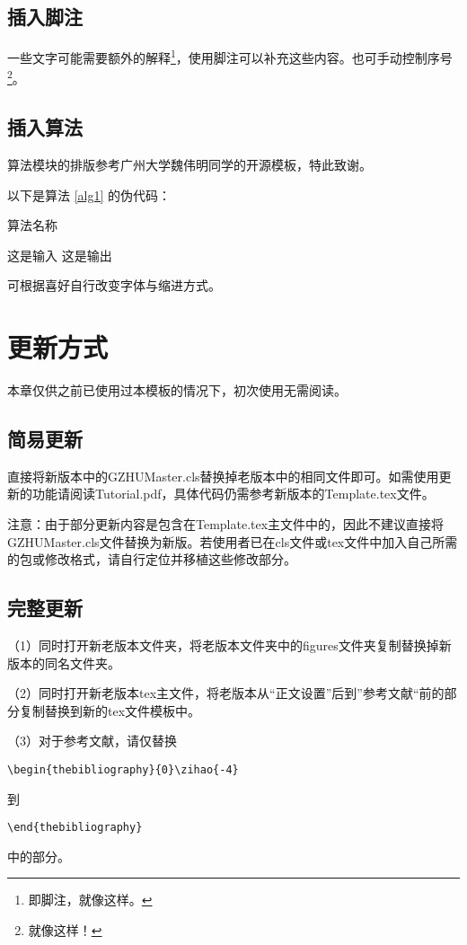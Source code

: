 \documentclass{GZHUMaster}
\begin{document}
\section{插入脚注}
一些文字可能需要额外的解释\footnote{即脚注，就像这样。}，使用脚注可以补充这些内容。也可手动控制序号\footnote[16]{就像这样！}。
\section{插入算法}
算法模块的排版参考广州大学魏伟明同学的开源模板，特此致谢。\par
以下是算法 \ref{alg1} 的伪代码：\par
\begin{algorithm}[h]
  \caption{算法名称}
  \begin{algorithmic}[1] %
      \Require 这是输入
      \Ensure 这是输出
           
      \EndFor
      \EndIf
      \EndWhile
  \end{algorithmic}
  \label{alg1}
\end{algorithm}
可根据喜好自行改变字体与缩进方式。

\chapter{更新方式}
本章仅供之前已使用过本模板的情况下，初次使用无需阅读。
\section{简易更新}
直接将新版本中的GZHUMaster.cls替换掉老版本中的相同文件即可。如需使用更新的功能请阅读Tutorial.pdf，具体代码仍需参考新版本的Template.tex文件。\par
注意：由于部分更新内容是包含在Template.tex主文件中的，因此不建议直接将GZHUMaster.cls文件替换为新版。若使用者已在cls文件或tex文件中加入自己所需的包或修改格式，请自行定位并移植这些修改部分。
\section{完整更新}
（1）同时打开新老版本文件夹，将老版本文件夹中的figures文件夹复制替换掉新版本的同名文件夹。\par
（2）同时打开新老版本tex主文件，将老版本从“正文设置”后到”参考文献“前的部分复制替换到新的tex文件模板中。\par
（3）对于参考文献，请仅替换\par
\verb|\begin{thebibliography}{0}\zihao{-4}|\par
到\par
\verb|\end{thebibliography}|\par
中的部分。
\end{document}
